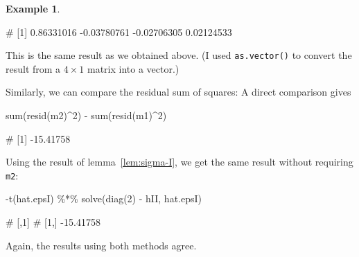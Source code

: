 \documentclass[
  a4paper,
]{article}
\newenvironment{Shaded}{\begin{snugshade}}{\end{snugshade}}
\newcommand{\DecValTok}[1]{\textcolor[rgb]{0.00,0.00,0.81}{#1}}
\newcommand{\FunctionTok}[1]{\textcolor[rgb]{0.00,0.00,0.00}{#1}}
\newcommand{\NormalTok}[1]{#1}
\newcommand{\SpecialCharTok}[1]{\textcolor[rgb]{0.00,0.00,0.00}{#1}}
\theoremstyle{definition}
\theoremstyle{definition}
\newtheorem{example}{Example}[section]
\theoremstyle{definition}
\theoremstyle{definition}
\theoremstyle{remark}
\begin{document}
\begin{example}
\begin{Shaded}
\begin{Highlighting}[]
\NormalTok{\# [1]  0.86331016 {-}0.03780761 {-}0.02706305  0.02124533}
\end{Highlighting}
\end{Shaded}

This is the same result as we obtained above. (I used \texttt{as.vector()} to
convert the result from a \(4\times 1\) matrix into a vector.)

Similarly, we can compare the residual sum of squares:
A direct comparison gives

\begin{Shaded}
\begin{Highlighting}[]
\FunctionTok{sum}\NormalTok{(}\FunctionTok{resid}\NormalTok{(m2)}\SpecialCharTok{\^{}}\DecValTok{2}\NormalTok{) }\SpecialCharTok{{-}} \FunctionTok{sum}\NormalTok{(}\FunctionTok{resid}\NormalTok{(m1)}\SpecialCharTok{\^{}}\DecValTok{2}\NormalTok{)}
\end{Highlighting}
\end{Shaded}

\begin{Shaded}
\begin{Highlighting}[]
\NormalTok{\# [1] {-}15.41758}
\end{Highlighting}
\end{Shaded}

Using the result of lemma~\ref{lem:sigma-I}, we get the same result
without requiring \texttt{m2}:

\begin{Shaded}
\begin{Highlighting}[]
\SpecialCharTok{{-}}\FunctionTok{t}\NormalTok{(hat.epsI) }\SpecialCharTok{\%*\%} \FunctionTok{solve}\NormalTok{(}\FunctionTok{diag}\NormalTok{(}\DecValTok{2}\NormalTok{) }\SpecialCharTok{{-}}\NormalTok{ hII, hat.epsI)}
\end{Highlighting}
\end{Shaded}

\begin{Shaded}
\begin{Highlighting}[]
\NormalTok{\#           [,1]}
\NormalTok{\# [1,] {-}15.41758}
\end{Highlighting}
\end{Shaded}

Again, the results using both methods agree.
\end{example}
\end{document}
